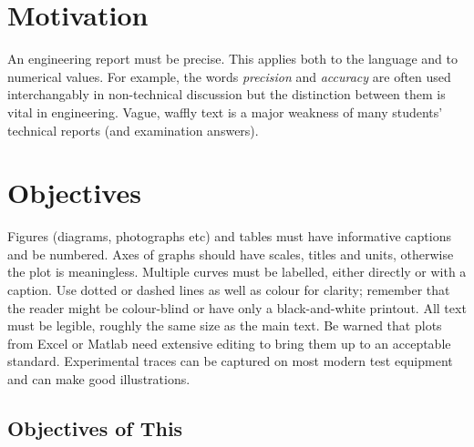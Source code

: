 \section{Motivation}

An engineering report must be precise. This applies both to the language and to numerical values. For example, the words \emph{precision} and \emph{accuracy} are often used interchangably in non-technical discussion but the distinction between them is vital in engineering. Vague, waffly text is a major weakness of many students' technical reports (and examination answers).

\section{Objectives}

Figures (diagrams, photographs etc) and tables must have informative captions and be numbered. Axes of graphs should have scales, titles and units, otherwise the plot is meaningless. Multiple curves must be labelled, either directly or with a caption. Use dotted or dashed lines as well as colour for clarity; remember that the reader might be colour-blind or have only a black-and-white printout. All text must be legible, roughly the same size as the main text. Be warned that plots from Excel or Matlab need extensive editing to bring them up to an acceptable standard. Experimental traces can be captured on most modern test equipment and can make good illustrations.

\subsection{Objectives of This}

